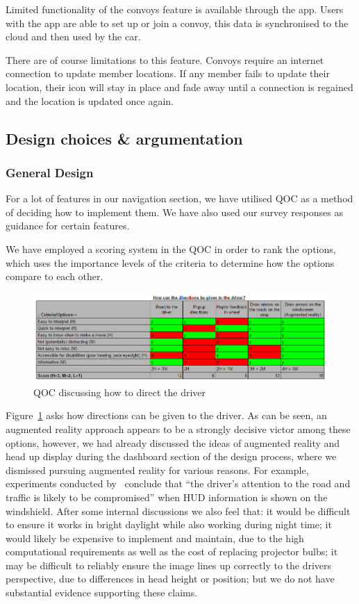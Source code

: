\documentclass{article}
\begin{document}
Limited functionality of the convoys feature is available through the app. Users with the app are able to set up or join a convoy, this data is synchronised to the cloud and then used by the car.

There are of course limitations to this feature. Convoys require an internet connection to update member locations. If any member fails to update their location, their icon will stay in place and fade away until a connection is regained and the location is updated once again.

\subsection{Design choices \& argumentation}\label{ssec:nav-design}
\subsubsection{General Design}\label{sssec:nav-design-general}
For a lot of features in our navigation section, we have utilised QOC as a method of deciding how to implement them. We have also used our survey responses as guidance for certain features.

We have employed a scoring system in the QOC in order to rank the options, which uses the importance levels of the criteria to determine how the options compare to each other.

\begin{figure}[H]
  \centering
  \includegraphics[width=\linewidth]{qoc-nav-instruction}
  \caption{QOC discussing how to direct the driver}\label{qoc-instructions}
\end{figure}

Figure~\ref{qoc-instructions} asks how directions can be given to the driver. As can be seen, an augmented reality approach appears to be a strongly decisive victor among these options, however, we had already discussed the ideas of augmented reality and head up display during the dashboard section of the design process, where we dismissed pursuing augmented reality for various reasons. For example, experiments conducted by~\cite{augmented-reality} conclude that ``the driver's attention to the road and traffic is likely to be compromised'' when HUD information is shown on the windshield. After some internal discussions we also feel that: it would be difficult to ensure it works in bright daylight while also working during night time; it would likely be expensive to implement and maintain, due to the high computational requirements as well as the cost of replacing projector bulbs; it may be difficult to reliably ensure the image lines up correctly to the drivers perspective, due to differences in head height or position; but we do not have substantial evidence supporting these claims.
\end{document}
